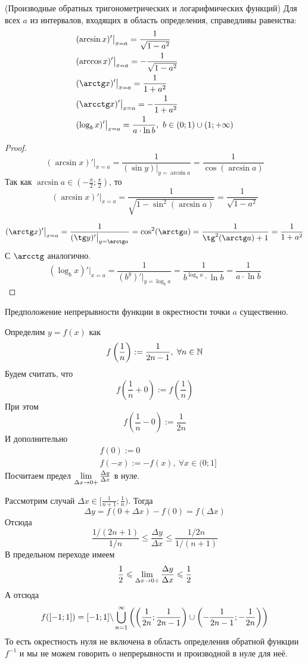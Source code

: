 \begin{corollary} (Производные обратных тригонометрических и логарифмических функций)
	Для всех $a$ из интервалов, входящих в область определения, справедливы равенства:
	\begin{align*}
		&(\arcsin x)' \big|_{x = a} = \frac{1}{\sqrt{1 - a^2}}
		\\
		&(\arccos x)' \big|_{x = a} = -\frac{1}{\sqrt{1 - a^2}}
		\\
		&(\arctg x)' \big|_{x = a} = \frac{1}{1 + a^2}
		\\
		&(\arcctg x)' \big|_{x = a} = -\frac{1}{1 + a^2}
		\\
		&(\log_b x)' \big|_{x = a} = \frac{1}{a \cdot \ln b},\ b \in (0; 1) \cup (1; +\infty)
	\end{align*}
\end{corollary}

\begin{proof}
	$$
		(\arcsin x)' \big|_{x = a} = \frac{1}{(\sin y) \big|_{y = \arcsin a}} = \frac{1}{\cos(\arcsin a)}
	$$
	Так как $\arcsin a \in (-\frac{\pi}{2}; \frac{\pi}{2})$, то
	$$
		(\arcsin x)' \big|_{x = a} = \frac{1}{\sqrt{1 - \sin^2(\arcsin a)}} = \frac{1}{\sqrt{1 - a^2}}
	$$
	
	$$
		(\arctg x)' \big|_{x = a} = \frac{1}{(\tg y)' \big|_{y = \arctg a}} = \cos^2 (\arctg a) = \frac{1}{\tg^2 (\arctg a) + 1} = \frac{1}{1 + a^2}
	$$
	С $\arcctg$ аналогично.
	$$
		(\log_b x)' \big|_{x = a} = \frac{1}{(b^y)' \big|_{y = \log_b a}} = \frac{1}{b^{\log_b a} \cdot \ln b} = \frac{1}{a \cdot \ln b}
	$$
\end{proof}

\begin{note}
	Предположение непрерывности функции в окрестности точки $a$ существенно.
\end{note}

\begin{example}
	Определим $y = f(x)$ как
	$$
		f\left(\frac{1}{n}\right) := \frac{1}{2n - 1},\ \forall n \in \mathbb{N}
	$$
	Будем считать, что
	$$
		f\left(\frac{1}{n} + 0\right) := f\left(\frac{1}{n}\right)
	$$
	При этом
	$$
		f\left(\frac{1}{n} - 0\right) := \frac{1}{2n}
	$$
	И дополнительно
	\begin{align*}
		&f(0) := 0
		\\
		&f(-x) := -f(x),\ \forall x \in (0; 1]
	\end{align*}
	Посчитаем предел $\lim\limits_{\Delta x \to 0+} \frac{\Delta y}{\Delta x}$ в нуле.
	
	Рассмотрим случай $\Delta x \in [\frac{1}{n + 1}; \frac{1}{n})$. Тогда
	$$
		\Delta y = f(0 + \Delta x) - f(0)  = f(\Delta x)
	$$
	Отсюда
	$$
		\frac{1 / (2n + 1)}{1 / n} \le \frac{\Delta y}{\Delta x} \le \frac{1 / 2n}{1 / (n + 1)}
	$$
	В предельном переходе имеем
	$$
		\frac{1}{2} \leqslant \lim\limits_{\Delta x \to 0+} \frac{\Delta y}{\Delta x} \leqslant \frac{1}{2}
	$$
	А отсюда
	$$
		f([-1; 1]) = [-1; 1] \backslash \bigcup\limits_{n = 1}^{\infty} \left(\left(\frac{1}{2n}; \frac{1}{2n - 1}\right) \cup \left(-\frac{1}{2n - 1}; -\frac{1}{2n}\right)\right)
	$$
	То есть окрестность нуля не включена в область определения обратной функции $f^{-1}$ и мы не можем говорить о непрерывности и производной в нуле для неё.
\end{example}

